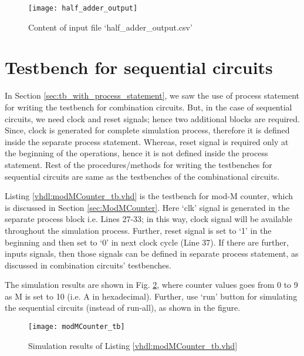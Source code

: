 \begin{figure}[!h]
	\centering
	\texttt{[image: half\_adder\_output]}
	\caption{Content of input file `half\_adder\_output.csv'}
	\label{fig:half_adder_output}
\end{figure}


\section{Testbench for sequential circuits}

In Section \ref{sec:tb_with_process_statement}, we saw the use of process statement for writing the testbench for combination circuits. But, in the case of sequential circuits, we need clock and reset signals; hence two additional blocks are required. Since, clock is generated for complete simulation process, therefore it is defined inside the separate process statement. Whereas, reset signal is required only at the beginning of the operations, hence it is not defined inside the process statement. Rest of the procedures/methods for writing the testbenches for sequential circuits are same as the testbenches of the combinational circuits. 

\begin{explanation}
	Listing \ref{vhdl:modMCounter_tb.vhd} is the testbench for mod-M counter, which is discussed in Section \ref{sec:ModMCounter}. Here `clk' signal is generated in the separate process block i.e. Lines 27-33; in this way, clock signal will be available throughout the simulation process. Further, reset signal is set to `1' in the beginning and then set to `0' in next clock cycle (Line 37). If there are further, inputs signals, then those signals can be defined in separate process statement, as discussed in combination circuits' testbenches. 
	
	The simulation results are shown in Fig. \ref{fig:modMCounter_tb}, where counter values goes from 0 to 9 as M is set to 10 (i.e. A in hexadecimal). Further, use `run' button for simulating the sequential circuits (instead of run-all), as shown in the figure. 
\end{explanation}




\begin{figure}[!h]
	\centering
	\texttt{[image: modMCounter\_tb]}
	\caption{Simulation results of Listing \ref{vhdl:modMCounter_tb.vhd}}
	\label{fig:modMCounter_tb}
\end{figure}

